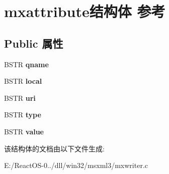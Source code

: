 \hypertarget{structmxattribute}{}\section{mxattribute结构体 参考}
\label{structmxattribute}
\subsection*{Public 属性}
\begin{DoxyCompactItemize}
\item 
\mbox{\label{structmxattribute_a5ef89e848509656d1b80137823832834}} 
B\+S\+TR {\bfseries qname}
\item 
\mbox{\label{structmxattribute_a65437be3617fbf5d286af3175eb8d3e4}} 
B\+S\+TR {\bfseries local}
\item 
\mbox{\label{structmxattribute_a9f284f9b4e738880035137953839f7bf}} 
B\+S\+TR {\bfseries uri}
\item 
\mbox{\label{structmxattribute_a67e6af067ca96e75c53ae05ac5334298}} 
B\+S\+TR {\bfseries type}
\item 
\mbox{\label{structmxattribute_a4d1880d216eeba907fe1203c841fa0d4}} 
B\+S\+TR {\bfseries value}
\end{DoxyCompactItemize}


该结构体的文档由以下文件生成\+:\begin{DoxyCompactItemize}
\item 
E\+:/\+React\+O\+S-\/0../dll/win32/msxml3/mxwriter.\+c\end{DoxyCompactItemize}

